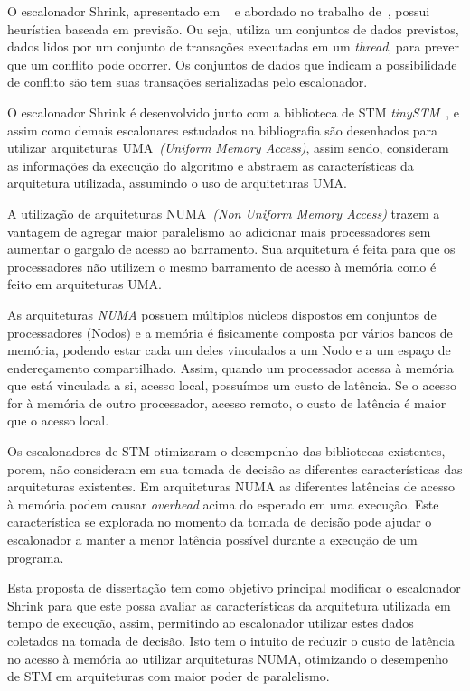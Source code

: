 \documentclass[diss-proposta,nocipinfo]{texufpel}
\begin{document}
O escalonador Shrink, apresentado em ~\cite{dragojevic09} e abordado no trabalho de~\cite{sanzo17}, possui heurística baseada em previsão. Ou seja, utiliza um conjuntos de dados previstos, dados lidos por um conjunto de transações executadas em um \emph{thread}, para prever que um conflito pode ocorrer. Os conjuntos de dados que indicam a possibilidade de conflito são tem suas transações serializadas pelo escalonador.

O escalonador Shrink é desenvolvido junto com a biblioteca de STM \emph{tinySTM}~\cite{TINY}, e assim como demais escalonares estudados na bibliografia são desenhados para utilizar arquiteturas UMA~\emph{(Uniform Memory Access)}, assim sendo, consideram as informações da execução do algoritmo e abstraem as características da arquitetura utilizada, assumindo o uso de arquiteturas UMA.

A utilização de arquiteturas NUMA~\emph{(Non Uniform Memory Access)} trazem a vantagem de agregar maior paralelismo ao adicionar mais processadores sem aumentar o gargalo de acesso ao barramento. Sua arquitetura é feita para que os processadores não utilizem o mesmo barramento de acesso à memória como é feito em arquiteturas UMA.

As arquiteturas \emph{NUMA} possuem múltiplos núcleos dispostos em conjuntos de processadores (Nodos) e a memória é fisicamente composta por vários bancos de memória, podendo estar cada um deles vinculados a um Nodo e a um espaço de endereçamento compartilhado. Assim, quando um processador acessa à memória que está vinculada a si, acesso local, possuímos um custo de latência. Se o acesso for à memória de outro processador, acesso remoto, o custo de latência é maior que o acesso local.

Os escalonadores de STM otimizaram o desempenho das bibliotecas existentes, porem, não consideram em sua tomada de decisão as diferentes características das arquiteturas existentes. Em arquiteturas NUMA as diferentes latências de acesso à memória podem causar \emph{overhead} acima do esperado em uma execução. Este característica se explorada no momento da tomada de decisão pode ajudar o escalonador a manter a menor latência possível durante a execução de um programa.

Esta proposta de dissertação tem como objetivo principal modificar o escalonador Shrink para que este possa avaliar as características da arquitetura utilizada em tempo de execução, assim, permitindo ao escalonador utilizar estes dados coletados na tomada de decisão. Isto tem o intuito de reduzir o custo de latência no acesso à memória ao utilizar arquiteturas NUMA, otimizando o desempenho de STM em arquiteturas com maior poder de paralelismo.
\end{document}
